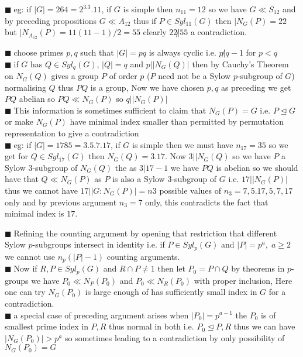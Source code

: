 \documentclass[11pt]{extarticle}
\newcommand{\snote}[1]{{\footnotesize(#1)}}
\newcommand{\y}{$\blacksquare\;$}
\newcommand{\tbx}[2][]{
	\begin{tcolorbox}[enhanced,breakable,size=small,colback=black!2!white,title={#1},arc is angular, arc=1.5mm,drop fuzzy shadow]
		#2
	\end{tcolorbox}
}
\begin{document}
\begin{multicols}{2}
{\y eg: if $ |G|=264=2^3.3.11 $, if $ G $ is simple then $ n_{11} = 12$ so we have $ G\ll S_{12} $ and by preceding propositions $ G\ll A_{12} $ thus if $ P\in Syl_{11}(G) $ then $ |N_G(P)=22 $ but $ |N_{A_{12}}(P)=11(11-1)/2=55 $ clearly $ 22\not| 55 $ a contradiction.}
\tbx[4. Playing $ p -$ subgroups off against each other for different primes $ p $ ]{
\y choose primes $ p,q $ such that $ |G|=pq $ is always cyclic i.e. $ p\not|q-1 $ for $ p<q $ \\
\y if $ G $ has $ Q\in Syl_q(G) $, $ |Q|=q $ and $ p||N_G(Q)| $  then by Cauchy's Theorem on $ N_G(Q) $ gives a group $ P $ of order $ p $ \snote{$ P $ need not be a Sylow $ p $-subgroup of $ G $} normalising $ Q $ thus $ PQ $ is a group, Now we have chosen $ p,q $ as preceding we get $ PQ $ abelian so $ PQ\ll N_G(P) $ so $ q||N_G(P)| $\\
\y This information is sometimes sufficient to claim that $ N_G(P)=G $ i.e. $ P\trianglelefteq G $ or make $ N_G(P) $ have minimal index smaller than permitted by permutation representation to give a contradiction\\
\y eg: if $ |G|=1785=3.5.7.17 $, if $ G $ is simple then we must have $ n_{17}=35$  so we get for  $Q\in Syl_{17}(G)  $ then $ N_G(Q)=3.17 $. Now $ 3||N_G(Q) $ so we have $ P $ a Sylow $ 3$-subgroup of $ N_G(Q) $ the as $ 3|17-1 $ we have $ PQ $ is abelian so we  should have that $ Q\ll N_G(P) $ as $ P $ is also a Sylow $ 3 $-subgroup  of $ G $ i.e. $ 17||N_G(P)| $ thus we cannot have $ 17||G:N_G(P)|=n3 $ possible values of $ n_3=7,5.17, 5,7,17$ only and by previous argument $ n_3=7 $ only, this contradicts the fact that minimal index is $ 17 $. }
\tbx[5. Studying normalizers of intersections of Syloy $ p- $ subgroups]{
\y Refining the counting argument by opening that restriction that different Sylow $ p $-subgroups intersect in identity i.e.  if $ P\in Syl_p(G) $ and $ |P|=p^a,\; a\geq 2 $ we cannot  use $ n_p(|P|-1) $ counting arguments.\\
\y Now if $ R,P\in Syl_p(G) $ and $ R\cap P\neq 1 $ then let $ P_0=P\cap Q $ by theorems in $ p $-groups we have $ P_0\ll N_P(P_0) $ and  $ P_0\ll N_R(P_0) $ with proper inclusion, Here one can try $ N_G(P_0) $ is large enough of has sufficiently small index in $ G $ for a contradiction.\\
\y a special case of preceding argument arises when $ |P_0|=p^{a-1} $ the $ P_0 $ is of smallest prime index in $ P,R $ thus normal in both i.e. $ P_0\trianglelefteq P,R $ thus we can have $ |N_G(P_0)|>p^a $ so sometimes leading to a contradiction by only possibility of $ N_G(P_0)=G $\\
}
\end{multicols}
\end{document}
